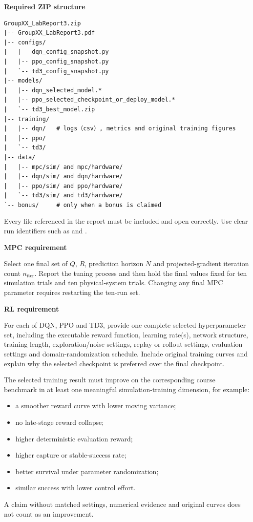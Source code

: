 \documentclass[11pt,a4paper]{article}
\newcommand{\code}[1]{\texttt{\detokenize{#1}}}
\begin{document}
\begin{requirementbox}
\textbf{Required ZIP structure}
\begin{verbatim}
GroupXX_LabReport3.zip
|-- GroupXX_LabReport3.pdf
|-- configs/
|   |-- dqn_config_snapshot.py
|   |-- ppo_config_snapshot.py
|   `-- td3_config_snapshot.py
|-- models/
|   |-- dqn_selected_model.*
|   |-- ppo_selected_checkpoint_or_deploy_model.*
|   `-- td3_best_model.zip
|-- training/
|   |-- dqn/   # logs（csv）, metrics and original training figures
|   |-- ppo/
|   `-- td3/
|-- data/
|   |-- mpc/sim/ and mpc/hardware/
|   |-- dqn/sim/ and dqn/hardware/
|   |-- ppo/sim/ and ppo/hardware/
|   `-- td3/sim/ and td3/hardware/
`-- bonus/     # only when a bonus is claimed
\end{verbatim}
Every file referenced in the report must be included and open correctly. Use
clear run identifiers such as \code{TD3_SIM_R01.csv} and
\code{TD3_HW_R01.png}.
\end{requirementbox}

\begin{requirementbox}
\textbf{MPC requirement}

Select one final set of $Q$, $R$, prediction horizon $N$ and projected-gradient
iteration count $n_{\mathrm{iter}}$. Report the tuning process and then hold the
final values fixed for ten simulation trials and ten physical-system trials.
Changing any final MPC parameter requires restarting the ten-run set.
\end{requirementbox}

\begin{requirementbox}
\textbf{RL requirement}

For each of DQN, PPO and TD3, provide one complete selected hyperparameter set,
including the executable reward function, learning rate(s), network structure,
training length, exploration/noise settings, replay or rollout settings,
evaluation settings and domain-randomization schedule. Include original
training curves and explain why the selected checkpoint is preferred over the
final checkpoint.

The selected training result must improve on the corresponding course benchmark
in at least one meaningful simulation-training dimension, for example:
\begin{itemize}
  \item a smoother reward curve with lower moving variance;
  \item no late-stage reward collapse;
  \item higher deterministic evaluation reward;
  \item higher capture or stable-success rate;
  \item better survival under parameter randomization;
  \item similar success with lower control effort.
\end{itemize}
A claim without matched settings, numerical evidence and original curves does
not count as an improvement.
\end{requirementbox}
\end{document}

